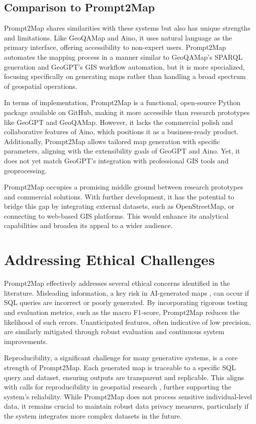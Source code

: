 \subsection{Comparison to Prompt2Map}

Prompt2Map shares similarities with these systems but also has unique strengths and limitations. Like GeoQAMap and Aino, it uses natural language as the primary interface, offering accessibility to non-expert users. Prompt2Map automates the mapping process in a manner similar to GeoQAMap's SPARQL generation and GeoGPT's GIS workflow automation, but it is more specialized, focusing specifically on generating maps rather than handling a broad spectrum of geospatial operations.

In terms of implementation, Prompt2Map is a functional, open-source Python package available on GitHub, making it more accessible than research prototypes like GeoGPT and GeoQAMap. However, it lacks the commercial polish and collaborative features of Aino, which positions it as a business-ready product. Additionally, Prompt2Map allows tailored map generation with specific parameters, aligning with the extensibility goals of GeoGPT and Aino. Yet, it does not yet match GeoGPT's integration with professional GIS tools and geoprocessing.

Prompt2Map occupies a promising middle ground between research prototypes and commercial solutions. With further development, it has the potential to bridge this gap by integrating external datasets, such as OpenStreetMap, or connecting to web-based GIS platforms. This would enhance its analytical capabilities and broaden its appeal to a wider audience.
\section{Addressing Ethical Challenges}

Prompt2Map effectively addresses several ethical concerns identified in the literature. Misleading information, a key risk in AI-generated maps \cite{zhang_ethics_2023}, can occur if SQL queries are incorrect or poorly generated. By incorporating rigorous testing and evaluation metrics, such as the macro F1-score, Prompt2Map reduces the likelihood of such errors. Unanticipated features, often indicative of low precision, are similarly mitigated through robust evaluation and continuous system improvements.

Reproducibility, a significant challenge for many generative systems, is a core strength of Prompt2Map. Each generated map is traceable to a specific SQL query and dataset, ensuring outputs are transparent and replicable. This aligns with calls for reproducibility in geospatial research \cite{zhang_ethics_2023}, further supporting the system's reliability. While Prompt2Map does not process sensitive individual-level data, it remains crucial to maintain robust data privacy measures, particularly if the system integrates more complex datasets in the future.

